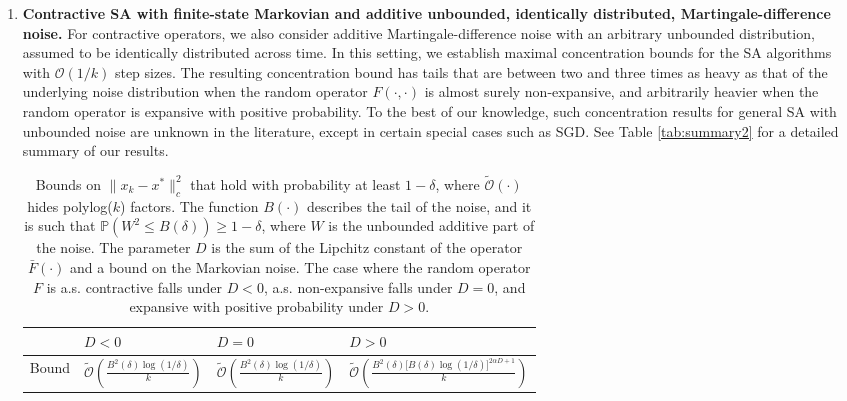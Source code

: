 \documentclass{article}
\newcommand{\lrp}[1]{\left( #1 \right)}
\begin{document}
\begin{enumerate}
    \item \textbf{Contractive SA with finite-state Markovian and additive unbounded, identically distributed, Martingale-difference noise.} For contractive operators, we also consider additive Martingale-difference noise with an arbitrary unbounded distribution, assumed to be identically distributed across time. In this setting, we establish maximal concentration bounds for the SA algorithms with $\mathcal{O}(1/k)$ step sizes. The resulting concentration bound has tails that are between two and three times as heavy as that of the underlying noise distribution when the random operator $F(\cdot, \cdot)$ is almost surely non-expansive, and arbitrarily heavier when the random operator is expansive with positive probability. To the best of our knowledge, such concentration results for general SA with unbounded noise are unknown in the literature, except in certain special cases such as SGD. See Table \ref{tab:summary2} for a detailed summary of our results.
\begin{table}[ht!]
\setlength{\arrayrulewidth}{0.3mm}
\renewcommand{\arraystretch}{1.9}
\begin{center}
\begin{tabular}{|
    >{\centering\arraybackslash}m{1.5cm}||
    >{\centering\arraybackslash}m{3cm}|
    >{\centering\arraybackslash}m{3cm}|
    >{\centering\arraybackslash}m{4.5cm}|} 
 \hline
 & $D<0$ 
 & $D = 0$ 
 & $D>0$ \\  
 \hline
 Bound
 & $\tilde{\mathcal{O}}\lrp{\frac{B^2(\delta)\log(1/\delta)}{k}}$
 & $\tilde{\mathcal{O}}\lrp{\frac{B^2(\delta)\log(1/\delta)}{k}}$
 & $\tilde{\mathcal{O}}\lrp{\frac{B^2(\delta)\big[B(\delta)\log(1/\delta)\big]^{2\alpha D + 1}}{k}}$ \\
 \hline
\end{tabular}
\end{center}
\caption{Bounds on $\|x_k-x^*\|_c^2$ that hold with probability at least $1-\delta$, where $\tilde{\mathcal{O}}(\cdot)$ hides polylog($k$) factors. The function $B(\cdot)$ describes the tail of the noise, and it is such that $\mathbb{P}\lrp{W^2 \le B(\delta)} \ge 1-\delta$, where $W$ is the unbounded additive part of the noise. The parameter $D$ is the sum of the Lipchitz constant of the operator $\bar{F}(\cdot)$ and a bound  on the Markovian noise. The case where the random operator $F$ is a.s. contractive falls under $D<0$, a.s. non-expansive falls under $D=0$, and expansive with positive probability under $D>0$. %
}
\end{table}
\end{enumerate}
\end{document}
